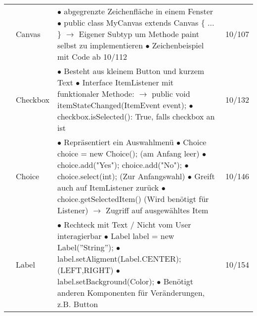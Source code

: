 \documentclass[11pt,a4paper]{article}
\begin{document}
\begin{center}
\begin{longtable}[h]{ | p{2.3cm} | p{2.3cm} | p{12.6cm} | p{1.2cm} | }
	& Canvas & \makecell[l]{$\bullet$ abgegrenzte Zeichenfläche in einem Fenster \\
	$\bullet$ public class MyCanvas extends Canvas \{ ... \}\\
	\hspace{0.4cm} $\rightarrow$ Eigener Subtyp um Methode paint selbst zu implementieren \\
	$\bullet$ Zeichenbeispiel mit Code ab 10/112 }  & 10/107 \\ \cline{2-4}
	
	& Checkbox & \makecell[l]{$\bullet$ Besteht aus kleinem Button und kurzem Text \\
	$\bullet$ Interface ItemListener mit funktionaler Methode: \\
	\hspace{0.4cm} $\rightarrow$ public void itemStateChanged(ItemEvent event); \\
	$\bullet$ checkbox.isSelected(): True, falls checkbox an ist \\ }  & 10/132 \\ \cline{2-4}
	
	& Choice & \makecell[l]{$\bullet$ Repräsentiert ein Auswahlmenü \\
	$\bullet$ Choice choice = new Choice(); (am Anfang leer) \\
	$\bullet$ choice.add("Yes"); choice.add("No"); \\
	$\bullet$ choice.select(int); (Zur Anfangswahl) \\
	$\bullet$ Greift auch auf ItemListener zurück \\
	$\bullet$ choice.getSelectedItem() (Wird benötigt für Listener) \\
	\hspace{0.4cm} $\rightarrow$ Zugriff auf ausgewähltes Item }  & 10/146 \\ \cline{2-4}
	
	& Label & \makecell[l]{$\bullet$ Rechteck mit Text / Nicht vom User interagierbar \\
	$\bullet$ Label label = new Label(''String''); \\
	$\bullet$ label.setAligment(Label.CENTER); (LEFT,RIGHT) \\
	$\bullet$ label.setBackground(Color); \\
	$\bullet$ Benötigt anderen Komponenten für Veränderungen, z.B. Button}  & 10/154 \\ \cline{2-4}
	

\end{longtable}
\end{center}
\end{document}
